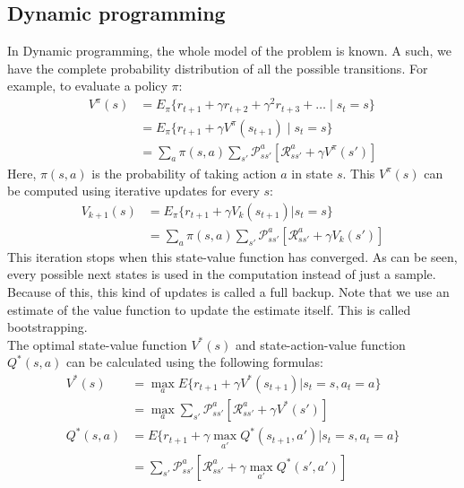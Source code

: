 \documentclass[a4paper, 11pt]{article}
\begin{document}
\subsection{Dynamic programming}
\label{sub:rldp}
In Dynamic programming, the whole model of the problem is known. A such, we have the complete probability distribution of all the possible transitions. For example, to evaluate a policy $\pi$:
\begin{align}
V^{\pi}(s) &= E_{\pi} \{r_{t+1} + \gamma r_{t+2} + \gamma^2r_{t+3}+\dots \mid s_t=s\}\\
&= E_{\pi} \{r_{t+1} + \gamma V^{\pi}(s_{t+1}) \mid s_t=s\}\\
&= \sum_a \pi(s,a) \sum_{s'} \mathcal{P}^a_{ss'} [\mathcal{R}^a_{ss'} + \gamma V^{\pi}(s')]
\end{align}
Here, $\pi(s,a)$ is the probability of taking action $a$ in state $s$. This $V^{\pi}(s)$ can be computed using iterative updates for every $s$:
\begin{align}
V_{k+1}(s) &= E_{\pi}\{r_{t+1} + \gamma V_k(s_{t+1}) \vert s_t=s\}\\
&= \sum_a \pi(s,a) \sum_{s'}\mathcal{P}^a_{ss'} [\mathcal{R}^a_{ss'} + \gamma V_k(s')]
\end{align}
This iteration stops when this state-value function has converged. As can be seen, every possible next states is used in the computation instead of just a sample. Because of this, this kind of updates is called a full backup.
Note that we use an estimate of the value function to update the estimate itself. This is called bootstrapping.\\
The optimal state-value function $V^*(s)$ and state-action-value function $Q^*(s,a)$ can be calculated using the following formulas:
\begin{align}
V^{*}(s) &= \max_a E\{r_{t+1} + \gamma V^{*}(s_{t+1}) \vert s_t = s, a_t = a\}\\
&= \max_a \sum_{s'} \mathcal{P}^a_{ss'} [\mathcal{R}^a_{ss'}+\gamma V^{*}(s')]\\
Q^{*}(s,a) &= E\{r_{t+1} + \gamma \max_{a'} Q^{*}(s_{t+1},a') \vert s_t=s, a_t=a\}\\
&= \sum_{s'} \mathcal{P}^a_{ss'} [\mathcal{R}^a_{ss'}+\gamma \max_{a'} Q^{*}(s',a')]
\end{align}
\end{document}
